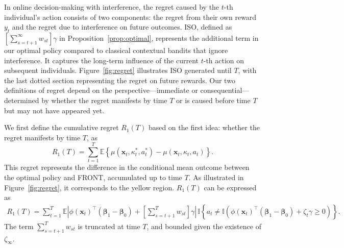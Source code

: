 \documentclass[12pt]{article}
\begin{document}
In online decision-making with interference, the regret caused by the $t$-th individual's action consists of two components: the regret from their own reward $y_t$ and the regret due to interference on future outcomes. ISO, defined as $\left[\sum_{s=t+1}^{\infty} w_{st}\right]\gamma$ in Proposition~\ref{prop:optimal}, represents the additional term in our optimal policy compared to classical contextual bandits that ignore interference. It captures the long-term influence of the current $t$-th action on subsequent individuals. Figure~\ref{fig:regret} illustrates ISO generated until $T$, with the last dotted section representing the regret on future rewards. Our two definitions of regret depend on the perspective—immediate or consequential—determined by whether the regret manifests by time $T$ or is caused before time $T$ but may not have appeared yet. 

We first define the cumulative regret $R_1(T)$ based on the first idea: whether the regret manifests by time $T$, as 
\begin{equation}
\label{equ:regret1}
    R_1(T) = \sum_{t=1}^T \mathbb{E} \left\{\mu(\bm{x}_t, \kappa_t^\ast, a_t^{\ast}) - \mu(\bm{x}_t,\kappa_t,a_t) \right\}.
\end{equation} 
This regret represents the difference in the conditional mean outcome between the optimal policy and FRONT, accumulated up to time $T$. As illustrated in Figure~\ref{fig:regret}, it corresponds to the yellow region. $R_1(T)$ can be expressed as 
\begin{align*}
    R_1(T) = \sum_{t=1}^{T} \mathbb{E} \left|\phi(\bm{x}_t)^{\top} (\bm{\beta}_1 - \bm{\beta}_0) + \left[\sum_{s=t+1}^T w_{st} \right] \gamma \right| \, \mathbb{I} \left\{ a_t \neq \mathbb{I} \left(\phi(\bm{x}_t)^{\top} (\bm{\beta}_1 - \bm{\beta}_0) + \zeta_t \gamma \ge 0\right) \right\}.
\end{align*}
The term $\sum_{s=t+1}^T w_{st}$ is truncated at time $T$, and bounded given the existence of $\zeta_\infty$. 
\end{document}

